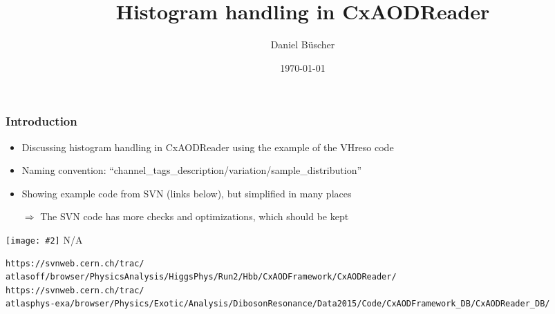 \documentclass{beamer}
\begin{document}

\newcommand{\newImage}[2]{
  \begin{minipage}{#1\textwidth}
  \renewcommand{\_}{_}
  \IfFileExists{#2}
  {\texttt{[image: \#2]}}
  {\centering N/A}
  \renewcommand{\_}{\textunderscore}
    \end{minipage}
}

\title{Histogram handling in CxAODReader}
\author[Daniel B\"uscher]{
Daniel B\"uscher%
}
\date{\today} 

\frame{\titlepage}

\scriptsize

\begin{frame}[fragile,t]
\frametitle{Introduction}
\begin{itemize}
 \item Discussing histogram handling in CxAODReader using the example of the VHreso code
 \item Naming convention: ``channel\_tags\_description/variation/sample\_distribution''
 \item Showing example code from SVN (links below), but simplified in many places
 \item[$\Rightarrow$] The SVN code has more checks and optimizations, which should be kept
\end{itemize}
\begin{center}
\newImage{0.8}{browser1.png}
\end{center}
{\tiny
\begin{verbatim}
https://svnweb.cern.ch/trac/
atlasoff/browser/PhysicsAnalysis/HiggsPhys/Run2/Hbb/CxAODFramework/CxAODReader/
https://svnweb.cern.ch/trac/
atlasphys-exa/browser/Physics/Exotic/Analysis/DibosonResonance/Data2015/Code/CxAODFramework_DB/CxAODReader_DB/
\end{verbatim}
}
\end{frame}
\end{document}
